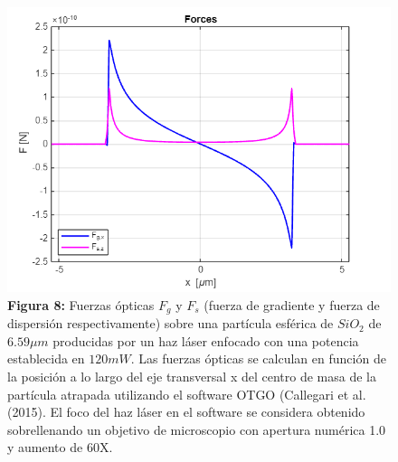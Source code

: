 \documentclass[10pt,aspectratio=1610,compress,dvipsnames]{beamer}
\begin{document}
\begin{frame}
{\begin{figure}
    \centering
    \includegraphics[scale=0.35]{Screenshot 2025-03-05 004832.png}
    \captionsetup{labelformat=empty}
    \caption{\textbf{Figura 8:} Fuerzas ópticas $F_g$ y $F_s$ (fuerza de gradiente y fuerza de dispersión respectivamente) sobre una partícula esférica de $SiO_2$ de $6.59 \mu m$ producidas por un haz láser enfocado con una potencia establecida en $120 mW$. Las fuerzas ópticas se calculan en función de la posición a lo largo del eje transversal x del centro de masa de la partícula atrapada utilizando el software OTGO (Callegari et al. (2015). El foco del haz láser en el software se considera obtenido sobrellenando un objetivo de microscopio con apertura numérica 1.0 y aumento de 60X.}
    \label{OpticalforcessetupKaren}
\end{figure} 

}





\end{frame}
\end{document}
